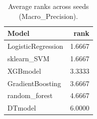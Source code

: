 \begin{table}[t]
\centering
\begin{tabular}{lr}
\toprule
Model & rank \\
\midrule
LogisticRegression & 1.6667 \\
sklearn_SVM & 1.6667 \\
XGBmodel & 3.3333 \\
GradientBoosting & 3.6667 \\
random_forest & 4.6667 \\
DTmodel & 6.0000 \\
\bottomrule
\end{tabular}
\caption{Average ranks across seeds (Macro_Precision).}
\label{tab:avg_rank_Macro_Precision}
\end{table}